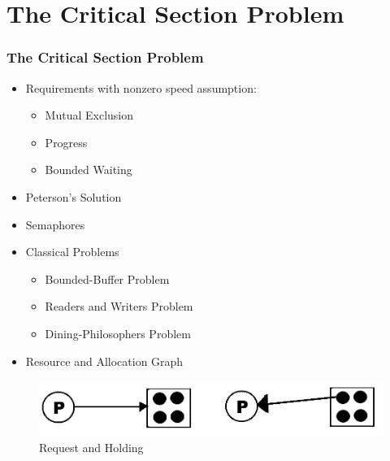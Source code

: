 \documentclass[aspectratio=169, xcolor=table, notheorems, hyperref={pdfpagelabels=false}]{beamer}
\begin{document}

\section{The Critical Section Problem}
\begin{frame}
\frametitle{The Critical Section Problem}
\begin{itemize}
\item Requirements with nonzero speed assumption:
\begin{itemize}
\item Mutual Exclusion
\item Progress
\item Bounded Waiting
\end{itemize}
\item Peterson's Solution
\item Semaphores
\item Classical Problems
\begin{itemize}
\item Bounded-Buffer Problem
\item Readers and Writers Problem
\item Dining-Philosophers Problem
\end{itemize}

\item Resource and Allocation Graph

\end{itemize}

\begin{figure}
\includegraphics[width=0.60\linewidth]{os07-graph}
\caption{Request and Holding}
\end{figure}

\end{frame}

\end{document}
